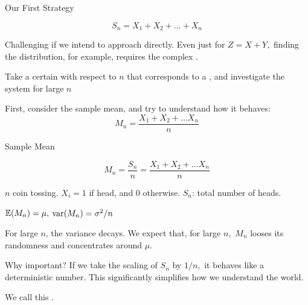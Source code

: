 \begin{frame}{Our First Strategy}

$$
S_n = X_1 + X_2 + \ldots + X_n
$$
\vspace{-0.8cm}
\plitemsep 0.1in
\bci 
\item<2-> Challenging if we intend to approach directly. Even just for $Z=X+Y,$ finding the distribution, for example, requires the complex . 

\item<3-> Take a certain  with respect to $n$ that corresponds to a , and investigate the system for large $n$ 

\item<4-> First, consider the sample mean, and try to understand how it behaves:
$$
M_n = \frac{X_1 + X_2+ \ldots X_n}{n}
$$

\eci 

\end{frame}

\begin{frame}{Sample Mean}

$$
M_n = \frac{S_n}{n} = \frac{X_1 + X_2+ \ldots X_n}{n}
$$

\plitemsep 0.1in

\bci 
\item<2->  $n$ coin tossing. $X_i=1$ if head, and 0 otherwise. $S_n$: total number of heads.

\item<3-> $\mathbb{E}( M_n ) = \mu,$ $\text{var}( M_n ) = \sigma^2/n$

\item<4-> For large $n$, the variance decays. We expect that, for large $n,$ $M_n$ looses its randomness and concentrates around $\mu.$

\item<5-> Why important? If we take the scaling of $S_n$ by $1/n,$ it behaves like a deterministic number. This significantly simplifies how we understand the world.

\item<6-> We call this .
\eci 

\end{frame}

